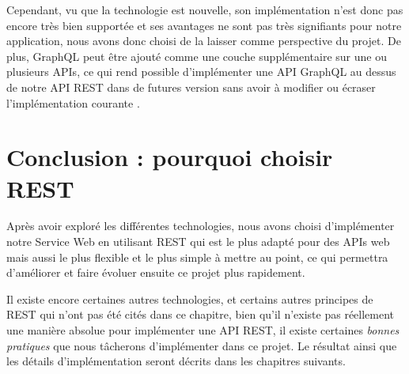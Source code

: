 \begin{description}
Cependant, vu que la technologie est nouvelle, son implémentation n'est donc pas encore très bien supportée et ses avantages ne sont pas très signifiants pour notre application, nous avons donc choisi de la laisser comme perspective du projet.
De plus, GraphQL peut être ajouté comme une couche supplémentaire sur une ou plusieurs APIs, ce qui rend possible d'implémenter une API GraphQL au dessus de notre API REST dans de futures version sans avoir à modifier ou écraser l'implémentation courante \cite{GraphQL}.
\end{description}

\section{Conclusion : pourquoi choisir REST}
	Après avoir exploré les différentes technologies, nous avons choisi d'implémenter notre Service Web en utilisant REST qui est le plus adapté pour des APIs web mais aussi le plus flexible et le plus simple à mettre au point, ce qui permettra d'améliorer et faire évoluer ensuite ce projet plus rapidement.
	
	Il existe encore certaines autres technologies, et certains autres principes de REST qui n'ont pas été cités dans ce chapitre, bien qu'il n'existe pas réellement une manière absolue pour implémenter une API REST, il existe certaines \emph{bonnes pratiques} que nous tâcherons d'implémenter dans ce projet. Le résultat ainsi que les détails d'implémentation seront décrits dans les chapitres suivants.
